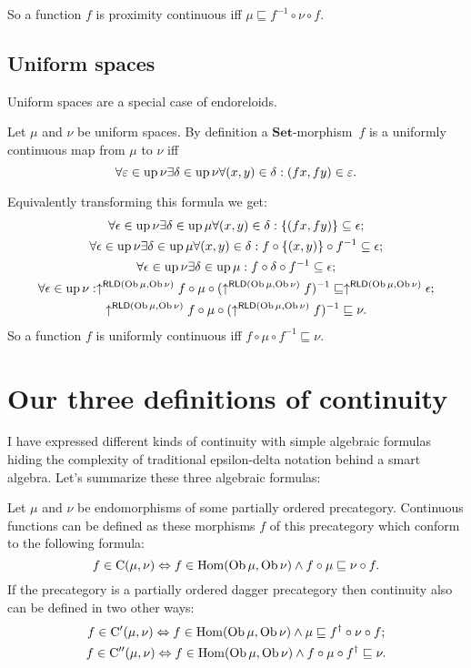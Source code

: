 So a function $f$ is proximity continuous iff $\mu\sqsubseteq f^{-1}\circ\nu\circ f$.


\subsection{Uniform spaces}

Uniform spaces are a special case of endoreloids.

Let $\mu$ and $\nu$ be uniform spaces. By definition a $\mathbf{Set}$-morphism~$f$
is a uniformly continuous map from $\mu$ to $\nu$ iff 
\[
\forall\varepsilon\in\operatorname{up}\nu\exists\delta\in\operatorname{up}\nu\forall(x,y)\in\delta:(fx,fy)\in\varepsilon.
\]


Equivalently transforming this formula we get:
\begin{gather*}
\forall\epsilon\in\operatorname{up}\nu\exists\delta\in\operatorname{up}\mu\forall(x,y)\in\delta:\{(fx,fy)\}\subseteq\epsilon;\\
\forall\epsilon\in\operatorname{up}\nu\exists\delta\in\operatorname{up}\mu\forall(x,y)\in\delta:f\circ\{(x,y)\}\circ f^{-1}\subseteq\epsilon;\\
\forall\epsilon\in\operatorname{up}\nu\exists\delta\in\operatorname{up}\mu:f\circ\delta\circ f^{-1}\subseteq\epsilon;\\
\forall\epsilon\in\operatorname{up}\nu:\uparrow^{\mathsf{RLD}(\operatorname{Ob}\mu,\operatorname{Ob}\nu)}f\circ\mu\circ(\uparrow^{\mathsf{RLD}(\operatorname{Ob}\mu,\operatorname{Ob}\nu)}f)^{-1}\sqsubseteq\uparrow^{\mathsf{RLD}(\operatorname{Ob}\mu,\operatorname{Ob}\nu)}\epsilon;\\
\uparrow^{\mathsf{RLD}(\operatorname{Ob}\mu,\operatorname{Ob}\nu)}f\circ\mu\circ(\uparrow^{\mathsf{RLD}(\operatorname{Ob}\mu,\operatorname{Ob}\nu)}f)^{-1}\sqsubseteq\nu.
\end{gather*}
So a function $f$ is uniformly continuous iff $f\circ\mu\circ f^{-1}\sqsubseteq\nu$.


\section{Our three definitions of continuity}

I have expressed different kinds of continuity with simple algebraic
formulas hiding the complexity of traditional epsilon-delta notation
behind a smart algebra. Let's summarize these three algebraic formulas:

Let $\mu$ and $\nu$ be endomorphisms of some partially ordered precategory.
Continuous functions can be defined as these morphisms $f$ of this
precategory which conform to the following formula:
\[
f\in\mathrm{C}(\mu,\nu)\Leftrightarrow f\in\operatorname{Hom}(\operatorname{Ob}\mu,\operatorname{Ob}\nu)\land f\circ\mu\sqsubseteq\nu\circ f.
\]
If the precategory is a partially ordered dagger precategory then
continuity also can be defined in two other ways:
\begin{gather*}
f\in\mathrm{C}'(\mu,\nu)\Leftrightarrow f\in\operatorname{Hom}(\operatorname{Ob}\mu,\operatorname{Ob}\nu)\land\mu\sqsubseteq f^{\dagger}\circ\nu\circ f;\\
f\in\mathrm{C}''(\mu,\nu)\Leftrightarrow f\in\operatorname{Hom}(\operatorname{Ob}\mu,\operatorname{Ob}\nu)\land f\circ\mu\circ f^{\dagger}\sqsubseteq\nu.
\end{gather*}

